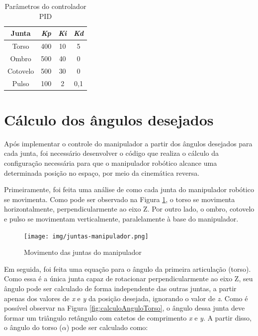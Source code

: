 \begin{table}[H]
    \centering
    \caption{Parâmetros do controlador PID}
    \begin{tabular}{|c|c|c|c|}
        \hline
        \textbf{Junta} & \textbf{\textit{Kp}} & \textbf{\textit{Ki}} & \textbf{\textit{Kd}} \\
        \hline
        Torso    & 400 & 10 & 5 \\
        \hline
        Ombro    & 500 & 40 & 0 \\
        \hline
        Cotovelo & 500 & 30 & 0 \\
        \hline
        Pulso    & 100 & 2 & 0,1 \\
        \hline        
    \end{tabular}
    \label{tab:parametrosPID}
\end{table}

\section[Cálculo dos ângulos desejados]{Cálculo dos ângulos desejados}
\label{sec:calculoAngulosDesejados}

Após implementar o controle do manipulador a partir dos ângulos desejados para cada junta, foi necessário desenvolver o código que realiza o cálculo da configuração necessária para que o manipulador robótico alcance uma determinada posição no espaço,
por meio da cinemática reversa.

Primeiramente, foi feita uma análise de como cada junta do manipulador robótico se movimenta.
Como pode ser observado na Figura \ref{fig:juntasManipulador},
o torso se movimenta horizontalmente, perpendicularmente ao eixo Z.
Por outro lado, o ombro, cotovelo e pulso se movimentam verticalmente, paralelamente à base do manipulador.

\begin{figure}[H]
    \centering
    \caption{Movimento das juntas do manipulador}
    \texttt{[image: img/juntas-manipulador.png]}
    \label{fig:juntasManipulador}
\end{figure}

Em seguida, foi feita uma equação para o ângulo da primeira articulação (torso).
Como essa é a única junta capaz de rotacionar perpendicularmente ao eixo Z, seu ângulo pode ser calculado de forma independente das outras juntas, 
a partir apenas dos valores de \textit{x} e \textit{y} da posição desejada, ignorando o valor de \textit{z}.
Como é possível observar na Figura \ref{fig:calculoAnguloTorso}, o ângulo dessa junta deve formar um triângulo retângulo com catetos de comprimento \textit{x} e \textit{y}.
A partir disso, o ângulo do torso ($\alpha$) pode ser calculado como:

